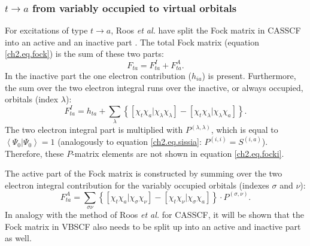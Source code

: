 \subsubsection{\label{ch2.sec.t-a}$t \rightarrow a$ from variably occupied to virtual orbitals}

For excitations of type $t \rightarrow a$, Roos \textit{et al.} have split the Fock matrix in CASSCF into an active and an inactive part \cite{roos1}. The total Fock matrix (equation \ref{ch2.eq.fock}) is the sum of these two parts:
\begin{equation}
F_{ta}=F^{I}_{ta} + F^{A}_{ta}.
\label{ch2.eq.focksum}
\end{equation}
In the inactive part the one electron contribution ($h_{ia}$) is present. Furthermore, the sum over the two electron integral runs over the inactive, or always occupied, orbitals (index $\lambda$):
\begin{equation}
F^{I}_{ta} = h_{ta} + \sum_{\lambda} \left\{ \left[ \chi_t \chi_a | \chi_\lambda \chi_\lambda \right] - \left[ \chi_t \chi_\lambda | \chi_\lambda \chi_a \right] \right\}.
\label{ch2.eq.focki}
\end{equation}
The two electron integral part is multiplied with $P^{(\lambda,\lambda)}$, which is equal to $\left<\Psi_0 | \Psi_0 \right> = 1$ (analogously to equation \ref{ch2.eq.sissia}: $P^{(i,i)}=S^{(i,a)}$). Therefore, these $P$-matrix elements are not shown in equation \ref{ch2.eq.focki}. 

The active part of the Fock matrix is constructed by summing over the two electron integral contribution for the variably occupied orbitals (indexes $\sigma$ and $\nu$):
\begin{equation}
F^{A}_{ta} = \sum_{\sigma\nu} \left\{ \left[ \chi_t \chi_a | \chi_\sigma \chi_\nu \right] - \left[ \chi_t \chi_\nu | \chi_\sigma \chi_a \right] \right\} \cdot P^{(\sigma,\nu)}.
\label{ch2.eq.focka}
\end{equation}
In analogy with the method of Roos \textit{et al.} for CASSCF, it will be shown that the Fock matrix in VBSCF also needs to be split up into an active and inactive part as well.

